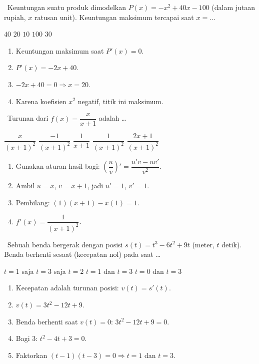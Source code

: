 \documentclass[11pt,a4paper]{exam}
\newenvironment{langkah}{%
  \begin{enumerate}[label=\textbf{Langkah \arabic*:},leftmargin=2.6em,
    itemsep=2pt,topsep=2pt]}{\end{enumerate}}
\newcommand{\Adv}{{\footnotesize\textsf{\textcolor{oranye}{[Advanced]}}}\ }
\newcommand{\Exp}{{\footnotesize\textsf{\textcolor{ungu}{[Expert]}}}\ }
\begin{document}
\begin{questions}
\question \Adv Keuntungan suatu produk dimodelkan $P(x) = -x^{2} + 40x - 100$
(dalam jutaan rupiah, $x$ ratusan unit). Keuntungan maksimum tercapai saat $x = \dots$
\begin{choices}
\choice $40$ \CorrectChoice $20$ \choice $10$ \choice $100$ \choice $30$
\end{choices}
\begin{solution}
\begin{langkah}
\item Keuntungan maksimum saat $P'(x) = 0$.
\item $P'(x) = -2x + 40$.
\item $-2x + 40 = 0 \Rightarrow x = 20$.
\item Karena koefisien $x^{2}$ negatif, titik ini maksimum.
\end{langkah}
\end{solution}

\question \Adv Turunan dari $f(x) = \dfrac{x}{x+1}$ adalah \dots
\begin{choices}
\choice $\dfrac{x}{(x+1)^{2}}$ \choice $\dfrac{-1}{(x+1)^{2}}$ \choice $\dfrac{1}{x+1}$
\CorrectChoice $\dfrac{1}{(x+1)^{2}}$ \choice $\dfrac{2x+1}{(x+1)^{2}}$
\end{choices}
\begin{solution}
\begin{langkah}
\item Gunakan aturan hasil bagi: $\left(\dfrac{u}{v}\right)' = \dfrac{u'v - uv'}{v^{2}}$.
\item Ambil $u=x$, $v=x+1$, jadi $u'=1$, $v'=1$.
\item Pembilang: $(1)(x+1) - x(1) = 1$.
\item $f'(x) = \dfrac{1}{(x+1)^{2}}$.
\end{langkah}
\end{solution}

\question \Exp Sebuah benda bergerak dengan posisi $s(t) = t^{3} - 6t^{2} + 9t$
(meter, $t$ detik). Benda berhenti sesaat (kecepatan nol) pada saat \dots
\begin{choices}
\choice $t=1$ saja \choice $t=3$ saja \choice $t=2$ \CorrectChoice $t=1$ dan $t=3$ \choice $t=0$ dan $t=3$
\end{choices}
\begin{solution}
\begin{langkah}
\item Kecepatan adalah turunan posisi: $v(t) = s'(t)$.
\item $v(t) = 3t^{2} - 12t + 9$.
\item Benda berhenti saat $v(t) = 0$: $3t^{2} - 12t + 9 = 0$.
\item Bagi 3: $t^{2} - 4t + 3 = 0$.
\item Faktorkan $(t-1)(t-3) = 0 \Rightarrow t=1$ dan $t=3$.
\end{langkah}
\end{solution}


\end{questions}
\end{document}
